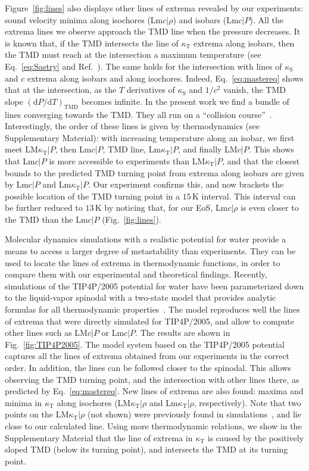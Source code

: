 \documentclass[12pt]{article}
\newcommand{\mrm}{\mathrm}
\newcommand{\unit}{\,\mrm}
\newcommand{\kT}{\kappa_\mrm{T}}
\newcommand{\kS}{\kappa_\mrm{S}}
\begin{document}
Figure~\ref{fig:lines} also displays other lines of extrema revealed by our experiments: sound velocity minima along isochores (Lm$c|\rho$) and isobars (Lm$c|P$). All the extrema lines we observe approach the TMD line when the pressure decreases. It is known that, if the TMD intersects the line of $\kT$ extrema along isobars, then the TMD must reach at the intersection a maximum temperature (see Eq.~\ref{eq:Sastry} and Ref.~\cite{Sastry_singularityfree_1996}). The same holds for the intersection with lines of $\kS$ and $c$ extrema along isobars and along isochores. Indeed, Eq.~\ref{eq:mastereq} shows that at the intersection, as the $T$ derivatives of $\kS$ and $1/c^2$ vanish, the TMD slope $(\mrm{d}P /\mrm{d}T )_\mrm{TMD}$ becomes infinite. In the present work we find a bundle of lines converging towards the TMD. They all run on a ``collision course''~\cite{Debenedetti_physics_2013}. Interestingly, the order of these lines is given by thermodynamics (see Supplementary Material): with increasing temperature along an isobar, we first meet LM$\kT|P$, then Lm$c|P$, TMD line, Lm$\kT|P$, and finally LM$c|P$. This shows that Lm$c|P$ is more accessible to experiments than LM$\kT|P$, and that the closest bounds to the predicted TMD turning point from extrema along isobars are given by Lm$c|P$ and Lm$\kT|P$. Our experiment confirms this, and now brackets the possible location of the TMD turning point in a $15\unit{K}$ interval. This interval can be further reduced to $13\unit{K}$ by noticing that, for our EoS, Lm$c|\rho$ is even closer to the TMD than the Lm$c|P$ (Fig.~\ref{fig:lines}).

Molecular dynamics simulations with a realistic potential for water provide a means to access a larger degree of metastability than experiments. They can be used to locate the lines of extrema in thermodynamic functions, in order to compare them with our experimental and theoretical findings. Recently, simulations of the TIP4P/2005 potential for water have been parameterized down to the liquid-vapor spinodal with a two-state model that provides analytic formulas for all thermodynamic properties~\cite{Biddle_twostructure_2017}. The model reproduces well the lines of extrema that were directly simulated for TIP4P/2005, and allow to compute other lines such as LM$c|P$ or Lm$c|P$. The results are shown in Fig.~\ref{fig:TIP4P2005}. The model system based on the TIP4P/2005 potential captures all the lines of extrema obtained from our experiments in the correct order. In addition, the lines can be followed closer to the spinodal. This allows observing the TMD turning point, and the intersection with other lines there, as predicted by Eq.~\ref{eq:mastereq}. New lines of extrema are also found: maxima and minima in $\kT$ along isochores (LM$\kT|\rho$ and Lm$\kT|\rho$, respectively). Note that two points on the LM$\kT|\rho$ (not shown) were previously found in simulations~\cite{Pallares_anomalies_2014}, and lie close to our calculated line. Using more thermodynamic relations, we show in the Supplementary Material that the line of extrema in $\kT$ is caused by the positively sloped TMD (below its turning point), and intersects the TMD at its turning point.
\end{document}
